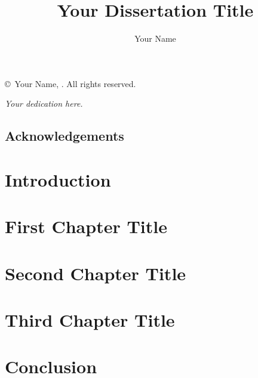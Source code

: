 \documentclass[letterpaper,12pt,oneside]{memoir}
\title{Your Dissertation Title}
\author{Your Name}
\begin{document}
\frontmatter

\begin{titlingpage}
  
\end{titlingpage}

\thispagestyle{empty}
\vspace*{\fill}
\begin{center}
    \copyright \ Your Name, \the\year.  All rights reserved.
\end{center}
\clearpage
{}

\thispagestyle{plain}
\vspace*{\fill}
\begin{center}
  \textit{Your dedication here.}
\end{center}
\vspace*{\fill}
\clearpage

\section*{Acknowledgements}

\clearpage


\clearpage

\tableofcontents*


\mainmatter
\DoubleSpacing

\chapter{Introduction}\label{ch:intro}


\chapter{First Chapter Title}\label{ch:chapter1}


\chapter{Second Chapter Title}\label{ch:chapter2}


\chapter{Third Chapter Title}\label{ch:chapter3}


\chapter{Conclusion}\label{ch:conclusion}



\backmatter

\nocite{*}
\printbibliography
\end{document}

